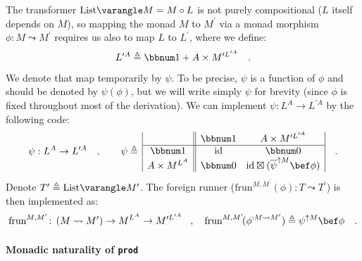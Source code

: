 The transformer $\text{List}\varangle M=M\circ L$ is not purely compositional
($L$ itself depends on $M$), so mapping the monad $M$ to $M^{\prime}$
via a monad morphism $\phi:M\leadsto M^{\prime}$ requires us also
to map $L$ to $L^{\prime}$, where we define: 
\[
L^{\prime A}\triangleq\bbnum 1+A\times M^{\prime L^{\prime A}}\quad.
\]
We denote that map temporarily by $\psi$. To be precise, $\psi$
is a function of $\phi$ and should be denoted by $\psi(\phi)$, but
we will write simply $\psi$ for brevity (since $\phi$ is fixed throughout
most of the derivation). We can implement $\psi:L^{A}\rightarrow L^{\prime A}$
by the following code:
\begin{equation}
\psi:L^{A}\rightarrow L^{\prime A}\quad,\quad\quad\psi\triangleq\,\begin{array}{|c||cc|}
 & \bbnum 1 & A\times M^{\prime L^{\prime A}}\\
\hline \bbnum 1 & \text{id} & \bbnum 0\\
A\times M^{L^{A}} & \bbnum 0 & \text{id}\boxtimes(\overline{\psi}^{\uparrow M}\bef\phi)
\end{array}\quad.\label{eq:list-monad-definition-of-psi}
\end{equation}
Denote $T^{\prime}\triangleq\text{List}\varangle M^{\prime}$. The
foreign runner ($\text{frun}^{M,M^{\prime}}(\phi):T\leadsto T^{\prime}$)
is then implemented as:
\[
\text{frun}^{M,M^{\prime}}\!:\,(M\leadsto M^{\prime})\rightarrow M^{L^{A}}\rightarrow M^{\prime L^{\prime A}}\!\quad,\quad\text{frun}^{M,M^{\prime}}\!(\phi^{:M\leadsto M^{\prime}})\triangleq\psi^{\uparrow M}\bef\phi\quad.
\]


\paragraph{Monadic naturality of \texttt{prod}}


